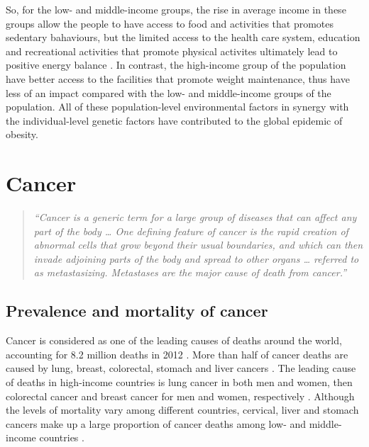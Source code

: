 So, for the low- and middle-income groups, the rise in average income in these groups allow the people to have access to food and activities that promotes sedentary bahaviours, but the limited access to the health care system, education and recreational activities that promote physical activites ultimately lead to positive energy balance \citep{Malik2013}.
In contrast, the high-income group of the population have better access to the facilities that promote weight maintenance, thus have less of an impact compared with the low- and middle-income groups of the population.
All of these population-level environmental factors in synergy with the individual-level genetic factors have contributed to the global epidemic of obesity.

\section{Cancer}
\label{sec:cancer}

\begin{quote}
	\textit{
	``Cancer is a generic term for a large group of diseases that can affect any part of the body \ldots{}
	One defining feature of cancer is the rapid creation of abnormal cells that grow beyond their usual boundaries, and which can then invade adjoining parts of the body and spread to other organs \ldots{}
	referred to as metastasizing.
	Metastases are the major cause of death from cancer.''
	\citep{WHO2016}
	}
\end{quote}

\subsection{Prevalence and mortality of cancer}
\label{sub:prevalence_and_mortality_of_cancer}

Cancer is considered as one of the leading causes of deaths around the world, accounting for 8.2 million deaths in 2012 \citep{WHO2014}.
More than half of cancer deaths are caused by lung, breast, colorectal, stomach and liver cancers \citep{WHO2014}.
The leading cause of deaths in high-income countries is lung cancer in both men and women, then colorectal cancer and breast cancer for men and women, respectively \citep{WHO2014}.
Although the levels of mortality vary among different countries, cervical, liver and stomach cancers make up a large proportion of cancer deaths among low- and middle-income countries \citep{WHO2014}.

